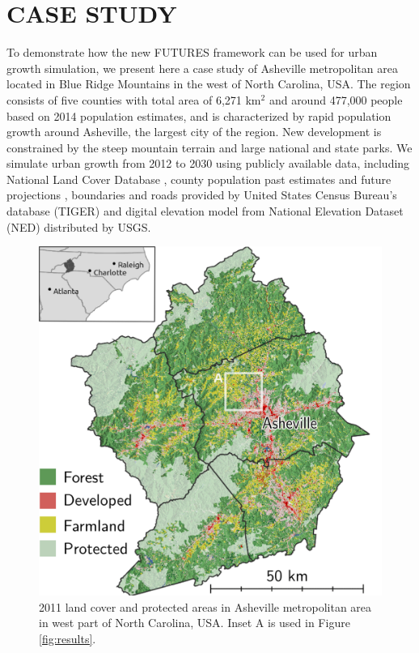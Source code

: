 \documentclass{isprs}
\begin{document}
\section{CASE STUDY}
To demonstrate how the new FUTURES framework
can be used for urban growth simulation,
we present here a case study of 
Asheville metropolitan area located in Blue Ridge Mountains in the west of North Carolina, USA.
The region consists of five counties with total area of 6,271 km$^2$ and around 477,000 people
based on 2014 population estimates,
and is characterized by rapid population growth around Asheville, the largest city of the region.
New development is constrained by the steep mountain terrain and large national and state parks.
We simulate urban growth from 2012 to 2030 using publicly available data,
including National Land Cover Database  \cite{nlcd2011,nlcd2006,nlcd2001,nlcdretro},
county population past estimates and future projections \cite{NCOSBM},
boundaries and roads provided by United States Census Bureau's database (TIGER)
and digital elevation model from National Elevation Dataset (NED) distributed by USGS.

\begin{figure}[h!]
 \centering
 \includegraphics[width=\columnwidth]{./figures/study_area_all.png}
 \caption{2011 land cover \protect\cite{nlcd2011} and protected areas \protect\cite{anderson2011conservation} in Asheville metropolitan area
 in west part of North Carolina, USA. Inset A is used in Figure \ref{fig:results}.}
 \label{fig:study_area}
\end{figure}
\end{document}
